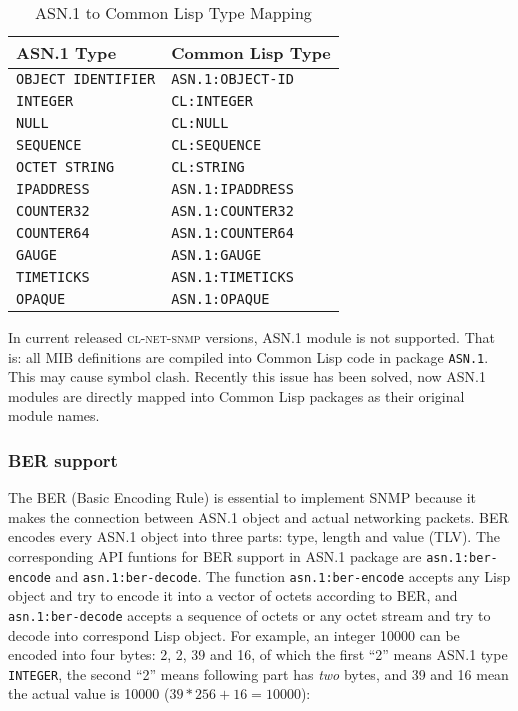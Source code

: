 \documentclass[reprint,natbib,9pt]{sigplanconf}
\begin{document}
\begin{table}
  \centering
  \caption{ASN.1 to Common Lisp Type Mapping}
  \label{table:asn.1-type-mapping}
  \begin{tabular}{|l|l|}
    \hline
    \textbf{ASN.1 Type} & \textbf{Common Lisp Type}\\
    \hline
    \texttt{OBJECT IDENTIFIER} & \texttt{ASN.1:OBJECT-ID}\\
    \texttt{INTEGER} & \texttt{CL:INTEGER}\\
    \texttt{NULL} & \texttt{CL:NULL}\\
    \texttt{SEQUENCE} & \texttt{CL:SEQUENCE}\\
    \texttt{OCTET STRING} & \texttt{CL:STRING}\\
    \texttt{IPADDRESS} & \texttt{ASN.1:IPADDRESS}\\
    \texttt{COUNTER32} & \texttt{ASN.1:COUNTER32}\\
    \texttt{COUNTER64} & \texttt{ASN.1:COUNTER64}\\
    \texttt{GAUGE} & \texttt{ASN.1:GAUGE}\\
    \texttt{TIMETICKS} & \texttt{ASN.1:TIMETICKS}\\
    \texttt{OPAQUE} & \texttt{ASN.1:OPAQUE}\\
    \hline
  \end{tabular}
\end{table}

In current released \textsc{cl-net-snmp} versions, ASN.1 module is not
supported. That is: all MIB definitions are compiled into Common Lisp
code in package \texttt{ASN.1}. This may cause symbol clash. Recently this
issue has been solved, now ASN.1 modules are directly mapped into
Common Lisp packages as their original module names.

\subsubsection{BER support}

The BER (Basic Encoding Rule) \cite{ISO:BER} is
essential to implement SNMP because it makes the connection between
ASN.1 object and actual networking packets. BER encodes
every ASN.1 object into three parts: type, length and value (TLV).
The corresponding API funtions for
BER support in ASN.1 package are \texttt{asn.1:ber-encode} and
\texttt{asn.1:ber-decode}. The function \texttt{asn.1:ber-encode} accepts
any Lisp object and try to encode it into a vector of octets
according to BER, and \texttt{asn.1:ber-decode} accepts
a sequence of octets or any octet stream and try to decode into
correspond Lisp object. For example, an integer 10000 can be
encoded into four bytes: 2, 2, 39 and 16, of which the first ``2''
means ASN.1 type \texttt{INTEGER}, the second ``2'' means following
part has \textsl{two} bytes, and 39 and 16 mean the actual value
is 10000 ($39*256+16 = 10000$):
\end{document}
